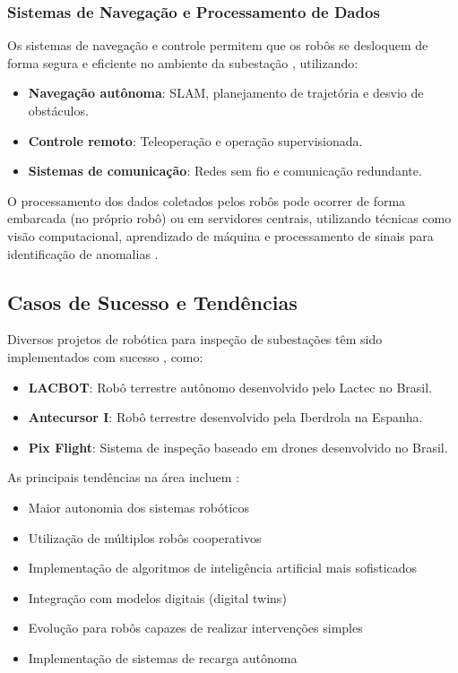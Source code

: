\subsubsection{Sistemas de Navegação e Processamento de Dados}

Os sistemas de navegação e controle permitem que os robôs se desloquem de forma segura e eficiente no ambiente da subestação \cite{Lactec2022, Eletrobras2024}, utilizando:

\begin{itemize}
    \item \textbf{Navegação autônoma}: SLAM, planejamento de trajetória e desvio de obstáculos.
    \item \textbf{Controle remoto}: Teleoperação e operação supervisionada.
    \item \textbf{Sistemas de comunicação}: Redes sem fio e comunicação redundante.
\end{itemize}

O processamento dos dados coletados pelos robôs pode ocorrer de forma embarcada (no próprio robô) ou em servidores centrais, utilizando técnicas como visão computacional, aprendizado de máquina e processamento de sinais para identificação de anomalias \cite{Iberdrola2022, Lactec2022}.

\subsection{Casos de Sucesso e Tendências}

Diversos projetos de robótica para inspeção de subestações têm sido implementados com sucesso \cite{Lactec2022, Iberdrola2022}, como:

\begin{itemize}
    \item \textbf{LACBOT}: Robô terrestre autônomo desenvolvido pelo Lactec no Brasil.
    \item \textbf{Antecursor I}: Robô terrestre desenvolvido pela Iberdrola na Espanha.
    \item \textbf{Pix Flight}: Sistema de inspeção baseado em drones desenvolvido no Brasil.
\end{itemize}

As principais tendências na área incluem \cite{GlobalGrowthInsights2024, Wang2024Advancements}:

\begin{itemize}
    \item Maior autonomia dos sistemas robóticos
    \item Utilização de múltiplos robôs cooperativos
    \item Implementação de algoritmos de inteligência artificial mais sofisticados
    \item Integração com modelos digitais (digital twins)
    \item Evolução para robôs capazes de realizar intervenções simples
    \item Implementação de sistemas de recarga autônoma
\end{itemize}

